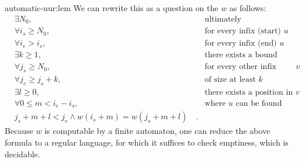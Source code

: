 \begin{proofof}{automatic-uur:lem}
	We can rewrite this as a question on the  $w$
	as follows:
	\begin{align*}
		&\exists N_0,                   &   \text{ultimately} \\
		&\forall i_s \geq N_0,          &   \text{for every infix (start) } u \\
		&\forall i_e > i_s,             &   \text{for every infix (end) }   u \\
		&\exists k \geq 1,              &   \text{there exists a bound} \\
		&\forall j_s \geq N_0,          &   \text{for every other infix (start) } v \\
		&\forall j_e \geq j_s + k,      &   \text{of size at least $k$} \\
		&\exists l \geq 0,              &   \text{there exists a position in } v \\
		&\forall 0 \leq m < i_e - i_s,  &   \text{where } u \text{ can be found} \\
		&j_s + m + l < j_e \land
		w(i_s + m) = w(j_s + m + l) \quad .
	\end{align*}
	Because $w$ is computable by a finite automaton, one can reduce the above
	formula to a regular language, for which it suffices to check emptiness, which
	is decidable.
\end{proofof}


